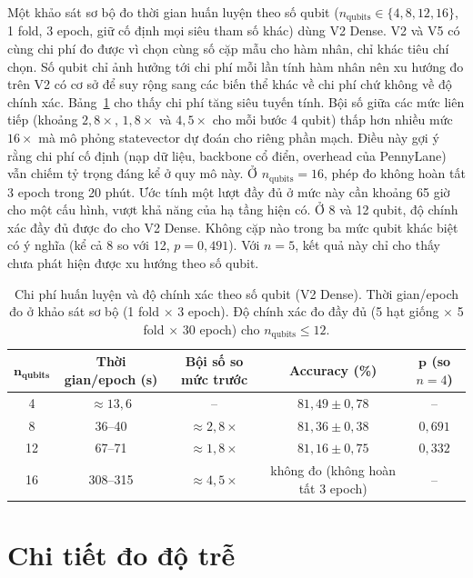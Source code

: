 Một khảo sát sơ bộ đo thời gian huấn luyện theo số qubit
($n_{\text{qubits}} \in \{4, 8, 12, 16\}$, 1 fold, 3 epoch, giữ cố định mọi
siêu tham số khác) dùng V2 Dense. V2 và V5 có cùng chi phí đo được vì chọn cùng
số cặp mẫu cho hàm nhân, chỉ khác tiêu chí chọn. Số qubit chỉ ảnh hưởng tới chi
phí mỗi lần tính hàm nhân nên xu hướng đo trên V2 có cơ sở để suy rộng sang
các biến thể khác về chi phí chứ không về độ chính xác.
Bảng~\ref{tab:qubitcost} cho thấy chi phí tăng siêu tuyến tính. Bội số giữa
các mức liên tiếp (khoảng $2{,}8\times$, $1{,}8\times$ và $4{,}5\times$ cho mỗi
bước 4 qubit) thấp hơn nhiều mức $16\times$ mà mô phỏng statevector dự đoán cho riêng phần mạch. Điều này gợi ý rằng chi phí cố định (nạp dữ liệu, backbone cổ
điển, overhead của PennyLane) vẫn chiếm tỷ trọng đáng kể ở quy mô này. Ở
$n_{\text{qubits}}=16$, phép đo không hoàn tất 3 epoch trong 20 phút. Ước tính
một lượt đầy đủ ở mức này cần khoảng 65 giờ cho một cấu hình, vượt khả năng
của hạ tầng hiện có. Ở 8 và 12 qubit, độ chính xác đầy đủ được đo cho V2
Dense. Không cặp nào trong ba mức qubit khác biệt có ý nghĩa (kể cả 8 so với
12, $p=0{,}491$). Với $n=5$, kết quả này chỉ cho thấy chưa phát hiện được xu
hướng theo số qubit.

\begin{table}[!htbp]
\centering
\caption{Chi phí huấn luyện và độ chính xác theo số qubit (V2 Dense).
Thời gian/epoch đo ở khảo sát sơ bộ (1 fold $\times$ 3 epoch). Độ chính
xác đo đầy đủ (5 hạt giống $\times$ 5 fold $\times$ 30 epoch) cho
$n_{\text{qubits}} \le 12$.}
\label{tab:qubitcost}
\footnotesize
\begin{tabular}{ccccc}
\toprule
$\boldsymbol{n_{\text{qubits}}}$ & \textbf{Thời gian/epoch (s)} & \textbf{Bội số so mức trước} & \textbf{Accuracy (\%)} & $\boldsymbol{p}$ \textbf{(so $n=4$)} \\
\midrule
4  & $\approx 13{,}6$ & -- & $81{,}49 \pm 0{,}78$ & -- \\
8  & 36--40 & $\approx 2{,}8\times$ & $81{,}36 \pm 0{,}38$ & $0{,}691$ \\
12 & 67--71 & $\approx 1{,}8\times$ & $81{,}16 \pm 0{,}75$ & $0{,}332$ \\
16 & 308--315 & $\approx 4{,}5\times$ & không đo (không hoàn tất 3 epoch) & -- \\
\bottomrule
\end{tabular}
\end{table}
\FloatBarrier

\section{Chi tiết đo độ trễ}
\label{app:dotre}

